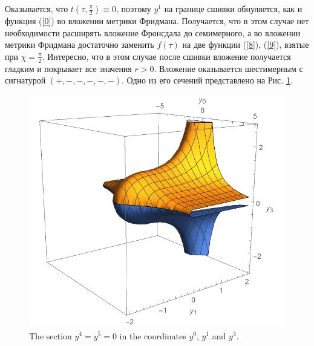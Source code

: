 \documentclass[12pt]{article}
\begin{document}
Оказывается, что $t(\tau, \frac{\pi}{2}) \equiv 0$, поэтому $y^1$ на границе сшивки обнуляется, как и функция (\ref{0}) во вложении метрики Фридмана. Получается, что в этом случае нет необходимости расширять вложение Фронсдала до семимерного, а во вложении метрики Фридмана достаточно заменить $f(\tau)$ на две функции  (\ref{8}), (\ref{9}), взятые при $\chi = \frac{\pi}{2}$. Интересно, что в этом случае после сшивки вложение получается гладким и покрывает все значения $r>0$. Вложение оказывается шестимерным с сигнатурой $(+, -, -, -, -, -)$. Одно из его сечений представлено на Рис. \ref{pic_emb}.

\begin{figure}[h!]
	\centering
	\includegraphics[width=0.55\linewidth]{Hole_with_matter_embedding.pdf}
	\caption{\label{pic_emb}The section $y^4 = y^5 = 0$ in the coordinates $ y^0 $, $ y^1 $ and $ y^3 $.}
\end{figure}



\end{document}
